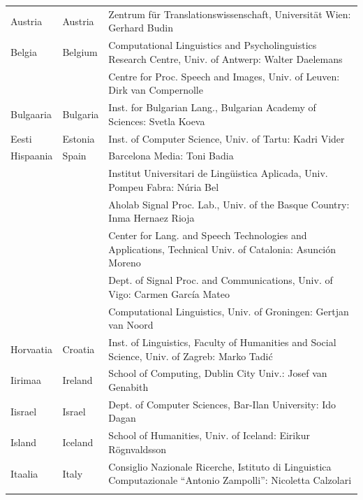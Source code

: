 \documentclass[]{../metanetpaper}
\begin{document}
\small
\begin{longtable}{llp{105mm}}
  Austria & \textcolor{grey1}{Austria} & Zentrum für Translationswissenschaft, Universität Wien: Gerhard Budin\\ \addlinespace 
  Belgia & \textcolor{grey1}{Belgium} & Computational Linguistics and Psycholinguistics Research Centre, Univ. of Antwerp: Walter Daelemans\\ \addlinespace
  & & Centre for Proc. Speech and Images, Univ. of Leuven: Dirk van Compernolle \\ \addlinespace
  Bulgaaria & \textcolor{grey1}{Bulgaria} & Inst. for Bulgarian Lang., Bulgarian Academy of Sciences: Svetla Koeva \\ \addlinespace
  Eesti & \textcolor{grey1}{Estonia} & Inst. of Computer Science, Univ. of Tartu: Kadri Vider\\ \addlinespace
  Hispaania & \textcolor{grey1}{Spain} & Barcelona Media: Toni Badia \\ \addlinespace 
  & & Institut Universitari de Lingüistica Aplicada, Univ. Pompeu Fabra: Núria Bel \\ \addlinespace 
  & & Aholab Signal Proc. Lab., Univ. of the Basque Country: Inma Hernaez Rioja \\ \addlinespace 
  & & Center for Lang. and Speech Technologies and Applications, Technical Univ. of Catalonia: Asunción Moreno \\ \addlinespace 
  & & Dept. of Signal Proc. and Communications, Univ. of Vigo: Carmen García Mateo \\ \addlinespace 
  & & Computational Linguistics, Univ. of Groningen: Gertjan van Noord\\ \addlinespace
  Horvaatia & \textcolor{grey1}{Croatia} & Inst. of Linguistics, Faculty of Humanities and Social Science, Univ. of Zagreb: Marko Tadić \\ \addlinespace
  Iirimaa & \textcolor{grey1}{Ireland} & School of Computing, Dublin City Univ.: Josef van Genabith\\ 
\addlinespace Iisrael & \textcolor{grey1}{Israel} & Dept. of Computer Sciences, Bar-Ilan University: Ido Dagan \\
\addlinespace  
  Island & \textcolor{grey1}{Iceland} & School of Humanities, Univ. of Iceland: Eirikur Rögnvaldsson\\ \addlinespace
  Itaalia & \textcolor{grey1}{Italy} & Consiglio Nazionale Ricerche, Istituto di Linguistica Computazionale ``Antonio Zampolli'': Nicoletta Calzolari\\ \addlinespace

\end{longtable}
\end{document}
